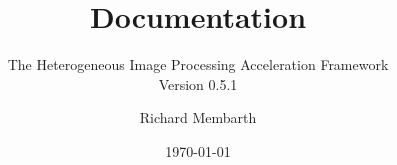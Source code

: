 


\title{\hipacc{} Documentation}
\subtitle{The Heterogeneous Image Processing Acceleration Framework\\Version 0.5.1}
\author{Richard Membarth}
\date{\today}

\maketitle

\cleardoublepage
\tableofcontents
\cleardoublepage






\nocite{membarth2011ggc}
\nocite{membarth2012gdg}
\nocite{membarth2012aoi}
\nocite{membarth2012msv}
\cleardoublepage
\appendix





